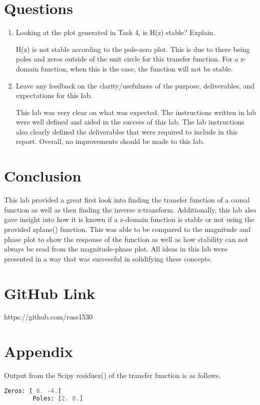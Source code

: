 \documentclass[12pt, titlepage]{article}
\begin{document}
    \section{Questions}
    \begin{enumerate}
        \item Looking at the plot generated in Task 4, is H(z) stable?  Explain.
        
        H(z) is not stable according to the pole-zero plot.  This is due to there being poles and zeros outside of the unit circle for this transfer function.  For a z-domain function, when this is the case, the function will not be stable.
        
        \item Leave any feedback on the clarity/usefulness of the purpose, deliverables, and expectations for this lab.
        
        This lab was very clear on what was expected. The instructions written in lab were well defined and aided in the success of this lab. The lab instructions also clearly defined the deliverables that were required to include in this report. Overall, no improvements should be made to this lab.
    \end{enumerate}
    
    
       
    \clearpage
    \section{Conclusion}
    
    This lab provided a great first look into finding the transfer function of a causal function as well as then finding the inverse z-transform.  Additionally, this lab also gave insight into how it is known if a z-domain function is stable or not using the provided zplane() function.  This was able to be compared to the magnitude and phase plot to show the response of the function as well as how stability can not always be read from the magnitude-phase plot.  All ideas in this lab were presented in a way that was successful in solidifying these concepts.
    
    
    \section{GitHub Link}
        https://github.com/russ1530
        
    \clearpage
    \section{Appendix}
    
    Output from the Scipy residuez() of the transfer function is as follows.
    
    \begin{lstlisting}[language=Python]
        Zeros: [ 6. -4.]
        Poles: [2. 8.]
    \end{lstlisting}
\end{document}
